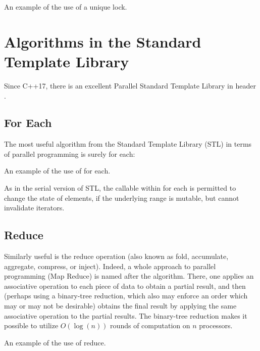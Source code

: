 \begin{itemize}
\begin{end}
\raggedbottom
\begin{codebox}[]{\href{https://godbolt.org/z/T8saW1sEv}{\ExternalLink}}
\footnotesize An example of the use of a unique lock.
\tcblower
{}
\end{codebox}

\section{Algorithms in the Standard Template Library}

Since C++17, there is an excellent Parallel Standard Template Library in header .

\subsection{For Each}
\label{sec:foreachcpp23}

The most useful algorithm from the Standard Template Library (STL) in terms of parallel programming is surely for each:

\raggedbottom
\begin{codebox}[]{\href{https://godbolt.org/z/dfzW6xTKc}{\ExternalLink}}
\footnotesize An example of the use of for each.
\tcblower
{}
\end{codebox}

As in the serial version of STL, the callable within for each is permitted to change the state of elements, if the underlying range is mutable, but cannot invalidate iterators.

\subsection{Reduce}

Similarly useful is the reduce operation (also known as fold, accumulate, aggregate, compress, or inject). Indeed, a whole approach to parallel programming (Map Reduce) is named after the algorithm. There, one applies an associative operation to each piece of data to obtain a partial result, and then (perhaps using a binary-tree reduction, which also may enforce an order which may or may not be desirable) obtains the final result by applying the same associative operation to the partial results. The binary-tree reduction makes it possible to utilize $O(\log(n))$ rounds of computation on $n$ processors. 

\raggedbottom
\begin{codebox}[]{\href{https://godbolt.org/z/Kb1rarPE7}{\ExternalLink}}
\footnotesize An example of the use of reduce.
\tcblower
{}
\end{codebox}


\end{end}
\end{itemize}
